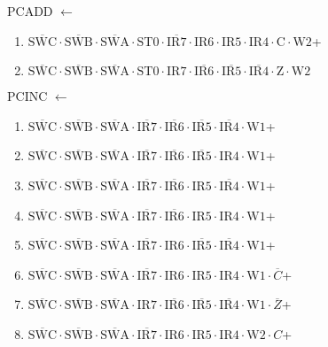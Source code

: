 \documentclass[UTF8]{ctexart}
\begin{document}
\noindent PCADD
$\leftarrow$
\begin{enumerate}[\indent\indent]
	\item$\overline{\text{SWC}}\cdot\overline{\text{SWB}}\cdot\overline{\text{SWA}}\cdot\text{ST0}\cdot\overline{\text{IR7}}\cdot{\text{IR6}}\cdot{\text{IR5}}\cdot{\text{IR4}}\cdot\text{C}\cdot\text{W2}$+
	\item$\overline{\text{SWC}}\cdot\overline{\text{SWB}}\cdot\overline{\text{SWA}}\cdot\text{ST0}\cdot{\text{IR7}}\cdot\overline{\text{IR6}}\cdot\overline{\text{IR5}}\cdot\overline{\text{IR4}}\cdot\text{Z}\cdot\text{W2}$
\end{enumerate}
\noindent PCINC
$\leftarrow$
\begin{enumerate}[\indent\indent]
	\item $\overline{\text{SWC}} \cdot\overline{\text{SWB}}\cdot \overline{\text{SWA}} \cdot \overline{\text{IR7}} \cdot \overline{\text{IR6}} \cdot \overline{\text{IR5}} \cdot \overline{\text{IR4}} \cdot \text{W1}$+
	\item $\overline{\text{SWC}} \cdot\overline{\text{SWB}}\cdot \overline{\text{SWA}} \cdot \overline{\text{IR7}} \cdot \overline{\text{IR6}} \cdot \overline{\text{IR5}} \cdot \text{IR4} \cdot \text{W1}$+
	\item $\overline{\text{SWC}} \cdot\overline{\text{SWB}}\cdot \overline{\text{SWA}} \cdot \overline{\text{IR7}} \cdot \overline{\text{IR6}} \cdot \text{IR5} \cdot \overline{\text{IR4}} \cdot \text{W1}$+
	\item $\overline{\text{SWC}} \cdot\overline{\text{SWB}}\cdot \overline{\text{SWA}} \cdot \overline{\text{IR7}} \cdot \overline{\text{IR6}} \cdot \text{IR5} \cdot \text{IR4} \cdot \text{W1}$+
	\item $\overline{\text{SWC}} \cdot\overline{\text{SWB}}\cdot \overline{\text{SWA}} \cdot \overline{\text{IR7}} \cdot \text{IR6} \cdot \overline{\text{IR5}} \cdot \overline{\text{IR4}} \cdot \text{W1}$+
	\item $\overline{\text{SWC}} \cdot\overline{\text{SWB}}\cdot \overline{\text{SWA}} \cdot \overline{\text{IR7}} \cdot \text{IR6} \cdot \text{IR5} \cdot \text{IR4} \cdot \text{W1} \cdot \overline{C}$+
	\item $\overline{\text{SWC}} \cdot\overline{\text{SWB}}\cdot \overline{\text{SWA}} \cdot \text{IR7} \cdot \overline{\text{IR6}} \cdot \overline{\text{IR5}} \cdot \overline{\text{IR4}} \cdot \text{W1} \cdot \overline{Z}$+
	\item $\overline{\text{SWC}} \cdot\overline{\text{SWB}}\cdot \overline{\text{SWA}} \cdot \overline{\text{IR7}} \cdot \text{IR6} \cdot \text{IR5} \cdot \text{IR4} \cdot \text{W2} \cdot C$+

\end{enumerate}
\end{document}
